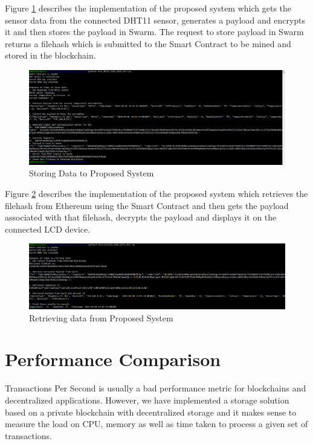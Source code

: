 \documentclass[11pt,openright]{report}
\begin{document}
Figure \ref{fig:store_prop_system_res} describes the implementation of the proposed system which gets the sensor data from the connected DHT11 sensor, generates a payload and encrypts it and then stores the payload in Swarm. The request to store payload in Swarm returns a filehash which is submitted to the Smart Contract to be mined and stored in the blockchain.

\begin{figure}
    \centering
    \includegraphics[scale=0.4]{results/IoTProd.png}
    \caption{Storing Data to Proposed System}
    \label{fig:store_prop_system_res}
\end{figure}

Figure \ref{fig:retrieve_prop_system_res} describes the implementation of the proposed system which retrieves the filehash from Ethereum using the Smart Contract and then gets the payload associated with that filehash, decrypts the payload and displays it on the connected LCD device.

\begin{figure}
    \centering
    \includegraphics[scale=0.4]{results/IoTConsole.png}
    \caption{Retrieving data from Proposed System}
    \label{fig:retrieve_prop_system_res}
\end{figure}

\section{Performance Comparison}
Transactions Per Second is usually a bad performance metric for blockchains and decentralized applications. However, we have implemented a storage solution based on a private blockchain with decentralized storage and it makes sense to measure the load on CPU, memory as well as time taken to process a given set of transactions.
\end{document}
